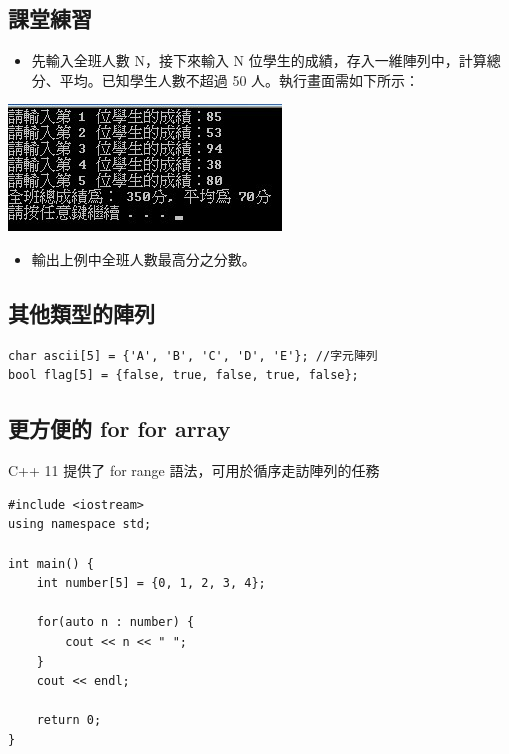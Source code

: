 \documentclass[a4paper,12pt]{article}
\begin{document}
\subsection{課堂練習}
\label{sec:org11d345b}
\begin{itemize}
\item 先輸入全班人數 N，接下來輸入 N 位學生的成績，存入一維陣列中，計算總分、平均。已知學生人數不超過 50 人。執行畫面需如下所示：\\
\end{itemize}
\begin{center}
\includegraphics[width=.9\linewidth]{images/array-3.jpg}
\end{center}
\begin{itemize}
\item 輸出上例中全班人數最高分之分數。\\
\end{itemize}
\subsection{其他類型的陣列}
\label{sec:org5315ff2}
\lstset{breaklines=true,language=cpp,label= ,caption= ,captionpos=b,firstnumber=1,numbers=left}
\begin{lstlisting}
char ascii[5] = {'A', 'B', 'C', 'D', 'E'}; //字元陣列
bool flag[5] = {false, true, false, true, false};
\end{lstlisting}

\subsection{更方便的 for for array}
\label{sec:org0f2f40e}
C++ 11 提供了 for range 語法，可用於循序走訪陣列的任務\\
\lstset{breaklines=true,language=cpp,label= ,caption= ,captionpos=b,firstnumber=1,numbers=left}
\begin{lstlisting}
#include <iostream>
using namespace std;

int main() {
    int number[5] = {0, 1, 2, 3, 4};

    for(auto n : number) {
        cout << n << " ";
    }
    cout << endl;

    return 0;
}
\end{lstlisting}
\end{document}
